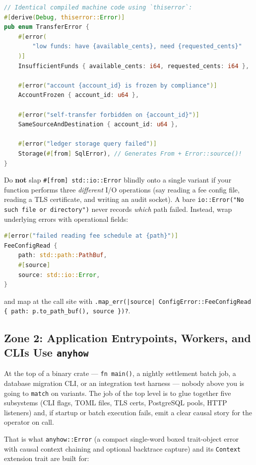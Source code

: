 \begin{lstlisting}[language=Rust]
// Identical compiled machine code using `thiserror`:
#[derive(Debug, thiserror::Error)]
pub enum TransferError {
    #[error(
        "low funds: have {available_cents}, need {requested_cents}"
    )]
    InsufficientFunds { available_cents: i64, requested_cents: i64 },

    #[error("account {account_id} is frozen by compliance")]
    AccountFrozen { account_id: u64 },

    #[error("self-transfer forbidden on {account_id}")]
    SameSourceAndDestination { account_id: u64 },

    #[error("ledger storage query failed")]
    Storage(#[from] SqlError), // Generates From + Error::source()!
}
\end{lstlisting}

\begin{trapbox}
Do \textbf{not} slap \texttt{\#[from] std::io::Error} blindly onto a single variant if your function performs three \emph{different} I/O operations (say reading a fee config file, reading a TLS certificate, and writing an audit socket). A bare \texttt{io::Error("No such file or directory")} never records \emph{which} path failed. Instead, wrap underlying errors with operational fields:
\begin{lstlisting}[language=Rust]
#[error("failed reading fee schedule at {path}")]
FeeConfigRead {
    path: std::path::PathBuf,
    #[source]
    source: std::io::Error,
}
\end{lstlisting}
and map at the call site with \texttt{.map\_err(|source| ConfigError::FeeConfigRead \{ path: p.to\_path\_buf(), source \})?}.
\end{trapbox}

\subsection{Zone 2: Application Entrypoints, Workers, and CLIs Use \texttt{anyhow}}

At the top of a binary crate --- \texttt{fn main()}, a nightly settlement batch job, a database migration CLI, or an integration test harness --- nobody above you is going to \texttt{match} on variants. The job of the top level is to glue together five subsystems (CLI flags, TOML files, TLS certs, PostgreSQL pools, HTTP listeners) and, if startup or batch execution fails, emit a clear causal story for the operator on call.

That is what \texttt{anyhow::Error} (a compact single-word boxed trait-object error with causal context chaining and optional backtrace capture) and its \texttt{Context} extension trait are built for:

